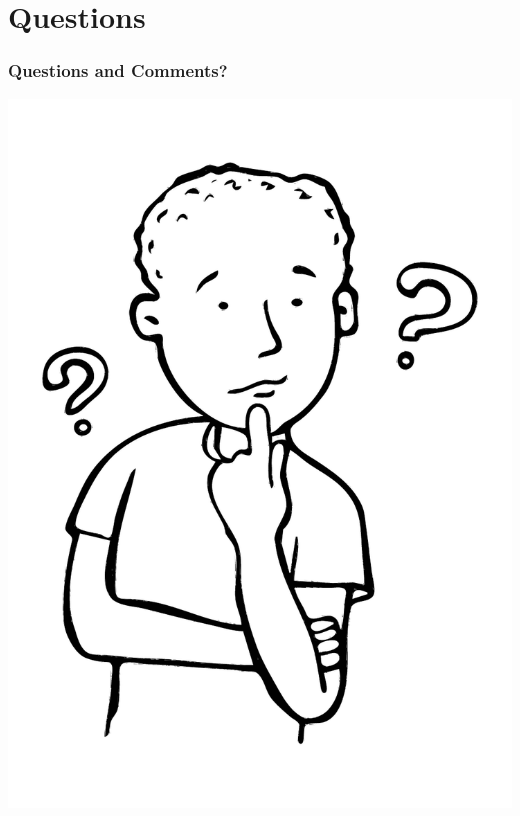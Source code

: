 \section{Questions}
\begin{frame}
    \frametitle{\textbf{Questions and Comments?}}
    \vspace{-15mm}
    \begin{center}
    \includegraphics[scale=0.4]{./figs/Boy-asking-question.pdf}
    \end{center}
    \vspace{-25mm}
\end{frame}

